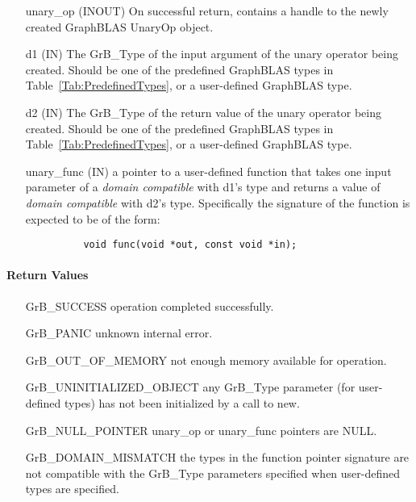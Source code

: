 \begin{itemize}[leftmargin=1.1in]
    \item[{\sf unary\_op}] ({\sf INOUT}) On successful return, contains a
                           handle to the newly created GraphBLAS UnaryOp object.
    \item[{\sf d1}] ({\sf IN})  The {\sf GrB\_Type} of the input 
                           argument of the unary operator being created.  Should be 
                           one of the predefined GraphBLAS types in 
                           Table~\ref{Tab:PredefinedTypes}, or a user-defined GraphBLAS type.
    \item[{\sf d2}] ({\sf IN})  The {\sf GrB\_Type} of the return value of the unary 
                           operator being created.  Should be one of the predefined 
                           GraphBLAS types in Table~\ref{Tab:PredefinedTypes}, or a 
                           user-defined GraphBLAS type.
    \item[{\sf unary\_func}] ({\sf IN})  a pointer to a user-defined function that takes 
                           one input parameter of a \emph{domain compatible} with {\sf d1}'s type
                           and returns a value of \emph{domain compatible} with {\sf d2}'s type.
                           Specifically the signature of the function is expected to 
                           be of the form:
          \begin{verbatim}
          void func(void *out, const void *in);
          \end{verbatim}
\end{itemize}

\paragraph{Return Values}

\begin{itemize}[leftmargin=2.1in]
\item[{\sf GrB\_SUCCESS}]           operation completed successfully.
\item[{\sf GrB\_PANIC}]             unknown internal error.
\item[{\sf GrB\_OUT\_OF\_MEMORY}]          not enough memory available for operation.
\item[{\sf GrB\_UNINITIALIZED\_OBJECT}]          any {\sf GrB\_Type} parameter (for
                                    user-defined types) has not been
                                    initialized by a call to {\sf new}.
\item[{\sf GrB\_NULL\_POINTER}]    {\sf unary\_op} or {\sf unary\_func}
                                    pointers are {\sf NULL}.
\item[{\sf GrB\_DOMAIN\_MISMATCH}]  the types in the function pointer signature
                                    are not compatible with the {\sf GrB\_Type}
                                    parameters specified when user-defined types
                                    are specified.
\end{itemize}

